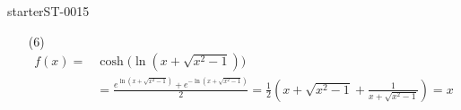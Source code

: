 \begin{corrige}{starterST-0015}
\begin{enumerate}
 \item[(6)] 
   \begin{equation*}
     \begin{aligned}
       f(x)=&\cosh\Big(\ln(x+\sqrt{x^2-1})\Big)\\
       &=\frac{e^{\ln(x+\sqrt{x^2-1})}+e^{-\ln(x+\sqrt{x^2-1})}}{2} = \frac{1}{2}\left(x+\sqrt{x^2-1} + \frac{1}{x+\sqrt{x^2-1}}\right)=x
     \end{aligned}
   \end{equation*}
\end{enumerate}

\end{corrige}
